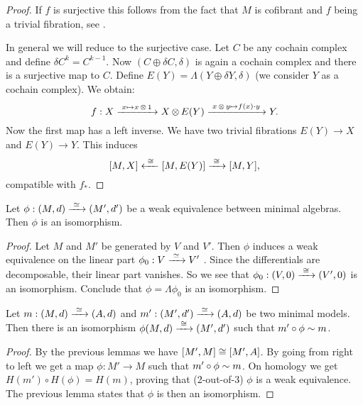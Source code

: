 \begin{proof}
	If $f$ is surjective this follows from the fact that $M$ is cofibrant and $f$ being a trivial fibration, see .

	 In general we will reduce to the surjective case. Let $C$ be any cochain complex and define $\delta C^k = C^{k-1}$. Now $(C \oplus \delta C, \delta)$ is again a cochain complex and there is a surjective map to $C$. Define $E(Y) = \Lambda(Y \oplus \delta Y, \delta)$ (we consider $Y$ as a cochain complex). We obtain:
	$$ f: X \xrightarrow{\,\,{x \mapsto x \operatorname*{\otimes} 1}\,\,} X \operatorname*{\otimes} E(Y) \xrightarrow{\,\,{x \operatorname*{\otimes} y \mapsto f(x) \cdot y}\,\,} Y. $$
	Now the first map has a left inverse. We have two trivial fibrations $E(Y) \to X$ and $E(Y) \to Y$. This induces
	$$ [M, X] \xleftarrow{\,\,{\cong}\,\,} [M, E(Y)] \xrightarrow{\,\,{\cong}\,\,} [M, Y], $$
	compatible with $f_\ast$.
\end{proof}

\begin{lemma}
	Let $\phi: (M, d) \xrightarrow{\,\,{\simeq}\,\,} (M', d')$ be a weak equivalence between minimal algebras. Then $\phi$ is an isomorphism.
\end{lemma}
\begin{proof}
	Let $M$ and $M'$ be generated by $V$ and $V'$. Then $\phi$ induces a weak equivalence on the linear part $\phi_0: V \xrightarrow{\,\,{\simeq}\,\,} V'$ \cite[Theorem 1.5.2]{loday}. Since the differentials are decomposable, their linear part vanishes. So we see that $\phi_0: (V, 0) \xrightarrow{\,\,{\cong}\,\,} (V', 0)$ is an isomorphism.
	Conclude that $\phi = \Lambda \phi_0$ is an isomorphism.
\end{proof}

\begin{theorem}
	Let $m: (M, d) \xrightarrow{\,\,{\simeq}\,\,} (A, d)$ and $m': (M', d') \xrightarrow{\,\,{\simeq}\,\,} (A, d)$ be two minimal models. Then there is an isomorphism $\phi (M, d) \xrightarrow{\,\,{\cong}\,\,} (M', d')$ such that $m' \circ \phi \sim m$.
\end{theorem}
\begin{proof}
	By the previous lemmas we have $[M', M] \cong [M', A]$. By going from right to left we get a map $\phi: M' \to M$ such that $m' \circ \phi \sim m$. On homology we get $H(m') \circ H(\phi) = H(m)$, proving that (2-out-of-3) $\phi$ is a weak equivalence. The previous lemma states that $\phi$ is then an isomorphism.
\end{proof}

